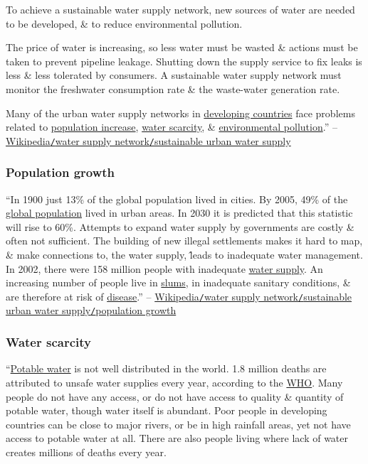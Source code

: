\documentclass[oneside]{book}
\numberwithin{equation}{section}
\begin{document}
To achieve a sustainable water supply network, new sources of water are needed to be developed, \& to reduce environmental pollution.

The price of water is increasing, so less water must be wasted \& actions must be taken to prevent pipeline leakage. Shutting down the supply service to fix leaks is less \& less tolerated by consumers. A sustainable water supply network must monitor the freshwater consumption rate \& the waste-water generation rate.

Many of the urban water supply networks in \href{https://en.wikipedia.org/wiki/Developing_countries}{developing countries} face problems related to \href{https://en.wikipedia.org/wiki/Population_increase}{population increase}, \href{https://en.wikipedia.org/wiki/Water_scarcity}{water scarcity}, \& \href{https://en.wikipedia.org/wiki/Environmental_pollution}{environmental pollution}.'' -- \href{https://en.wikipedia.org/wiki/Water_supply_network#Sustainable_urban_water_supply}{Wikipedia\texttt{/}water supply network\texttt{/}sustainable urban water supply}

\subsubsection{Population growth}
``In 1900 just 13\% of the global population lived in cities. By 2005, 49\% of the \href{https://en.wikipedia.org/wiki/Global_population}{global population} lived in urban areas. In 2030 it is predicted that this statistic will rise to 60\%. Attempts to expand water supply by governments are costly \& often not sufficient. The building of new illegal settlements makes it hard to map, \& make connections to, the water supply, \^ leads to inadequate water management. In 2002, there were 158 million people with inadequate \href{https://en.wikipedia.org/wiki/Water_supply}{water supply}. An increasing number of people live in \href{https://en.wikipedia.org/wiki/Slum}{slums}, in inadequate sanitary conditions, \& are therefore at risk of \href{https://en.wikipedia.org/wiki/Disease}{disease}.'' -- \href{https://en.wikipedia.org/wiki/Water_supply_network#Population_growth}{Wikipedia\texttt{/}water supply network\texttt{/}sustainable urban water supply\texttt{/}population growth}

\subsubsection{Water scarcity}
``\href{https://en.wikipedia.org/wiki/Potable_water}{Potable water} is not well distributed in the world. 1.8 million deaths are attributed to unsafe water supplies every year, according to the \href{https://en.wikipedia.org/wiki/World_Health_Organization}{WHO}. Many people do not have any access, or do not have access to quality \& quantity of potable water, though water itself is abundant. Poor people in developing countries can be close to major rivers, or be in high rainfall areas, yet not have access to potable water at all. There are also people living where lack of water creates millions of deaths every year.
\end{document}
